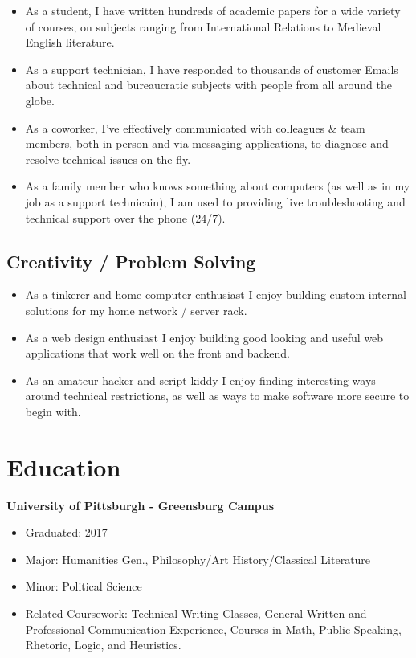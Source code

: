 \documentclass{article}
\begin{document}
\begin{itemize}
\item As a student, I have written hundreds of academic papers for a wide variety 
of courses, on subjects ranging from International Relations to Medieval English 
literature.

\item As a support technician, I have responded to thousands of customer Emails about 
technical and bureaucratic subjects with people from all around the globe.

\item As a coworker, I've effectively communicated with colleagues \& team members, 
both in person and via messaging applications, to diagnose and resolve technical 
issues on the fly.

\item As a family member who knows something about computers (as well as in my
job as a support technicain), I am used to providing live troubleshooting and technical 
support over the phone (24/7).
\end{itemize}

\subsection{Creativity / Problem Solving}

\begin{itemize}
\item As a tinkerer and home computer enthusiast I enjoy building custom internal
solutions for my home network / server rack.

\item As a web design enthusiast I enjoy building good looking and useful web
applications that work well on the front and backend.

\item As an amateur hacker and script kiddy I enjoy finding interesting ways 
around technical restrictions, as well as ways to make software more secure to begin 
with.
\end{itemize}

\section{Education}

\textbf{University of Pittsburgh - Greensburg Campus}

\begin{itemize}
\item Graduated: 2017

\item Major: Humanities Gen., Philosophy/Art History/Classical Literature

\item Minor: Political Science

\item Related Coursework: Technical Writing Classes, General Written and Professional
Communication Experience, Courses in Math, Public Speaking, Rhetoric, Logic,
and Heuristics.
\end{itemize}
\end{document}
